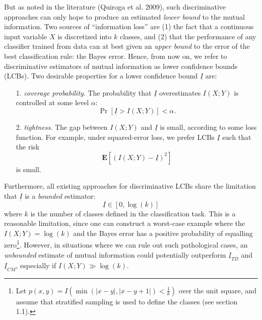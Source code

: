 \documentclass{article}
\newcommand{\E}{\textbf{E}}
\begin{document}
But as noted in the literature (Quiroga et al. 2009), such
discriminative approaches can only hope to produce an estimated
\emph{lower bound} to the mutual information.  Two sources of
``information loss'' are (1) the fact that a continuous input variable
$X$ is discretized into $k$ classes, and (2) that the performance of
any classifier trained from data can at best given an \emph{upper
  bound} to the error of the best classification rule: the Bayes
error.  Hence, from now on, we refer to discriminative estimators of
mutual information as lower confidence bounds (LCBs).  Two desirable
properties for a lower confidence bound $\underline{I}$ are:
\begin{itemize}
\item[1.] \emph{coverage probability}.  The probability that
  $\underline{I}$ overestimates $I(X; Y)$ is controlled at some level
  $\alpha$:
\[\Pr[\underline{I} > I(X; Y)] < \alpha.\]
\item[2.] \emph{tightness}.  The gap between $I(X; Y)$ and
  $\underline{I}$ is small, according to some loss function.  For
  example, under squared-error loss, we prefer LCBs $\underline{I}$
  such that the risk
\[
\E[(I(X; Y) - \underline{I})^2]
\]
is small.
\end{itemize}

Furthermore, all existing approaches for discriminative LCBs share the
limitation that $\underline{I}$ is a \emph{bounded} estimator:
\[
\underline{I} \in [0, \log(k)]
\] 
where $k$ is the number of classes defined in the classification task.
This is a reasonable limitation, since one can construct a worst-case
example where the $I(X; Y) = \log(k)$ and the Bayes error has a
positive probability of equalling zero\footnote{Let $p(x, y) =
  I(\min(|x - y|, |x - y + 1|) < \frac{1}{k})$ over the unit square,
  and assume that stratified sampling is used to define the classes
  (see section 1.1).}.  However, in situations where we can rule out
such pathological cases, an \emph{unbounded} estimate of mutual
information could potentially outperform $\underline{I}_{TD}$ and
$\underline{I}_{CM}$, especially if $I(X; Y) \gg \log(k)$.
\end{document}
